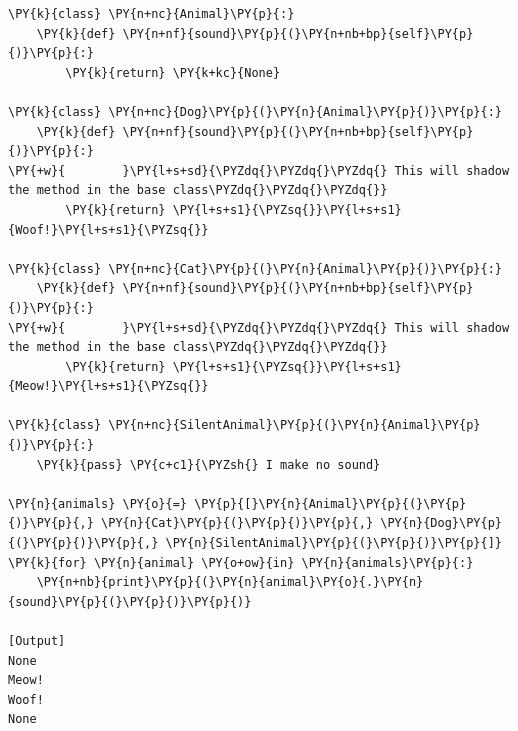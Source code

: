 \begin{Verbatim}[label=\makebox{\url{https://github.com/lucabaldini/cmepda/tree/master/slides/latex/snippets/overload.py}},commandchars=\\\{\}]
\PY{k}{class} \PY{n+nc}{Animal}\PY{p}{:}
    \PY{k}{def} \PY{n+nf}{sound}\PY{p}{(}\PY{n+nb+bp}{self}\PY{p}{)}\PY{p}{:}
        \PY{k}{return} \PY{k+kc}{None}

\PY{k}{class} \PY{n+nc}{Dog}\PY{p}{(}\PY{n}{Animal}\PY{p}{)}\PY{p}{:}
    \PY{k}{def} \PY{n+nf}{sound}\PY{p}{(}\PY{n+nb+bp}{self}\PY{p}{)}\PY{p}{:}
\PY{+w}{        }\PY{l+s+sd}{\PYZdq{}\PYZdq{}\PYZdq{} This will shadow the method in the base class\PYZdq{}\PYZdq{}\PYZdq{}}
        \PY{k}{return} \PY{l+s+s1}{\PYZsq{}}\PY{l+s+s1}{Woof!}\PY{l+s+s1}{\PYZsq{}}
        
\PY{k}{class} \PY{n+nc}{Cat}\PY{p}{(}\PY{n}{Animal}\PY{p}{)}\PY{p}{:}
    \PY{k}{def} \PY{n+nf}{sound}\PY{p}{(}\PY{n+nb+bp}{self}\PY{p}{)}\PY{p}{:}
\PY{+w}{        }\PY{l+s+sd}{\PYZdq{}\PYZdq{}\PYZdq{} This will shadow the method in the base class\PYZdq{}\PYZdq{}\PYZdq{}}
        \PY{k}{return} \PY{l+s+s1}{\PYZsq{}}\PY{l+s+s1}{Meow!}\PY{l+s+s1}{\PYZsq{}}

\PY{k}{class} \PY{n+nc}{SilentAnimal}\PY{p}{(}\PY{n}{Animal}\PY{p}{)}\PY{p}{:}
    \PY{k}{pass} \PY{c+c1}{\PYZsh{} I make no sound}
     
\PY{n}{animals} \PY{o}{=} \PY{p}{[}\PY{n}{Animal}\PY{p}{(}\PY{p}{)}\PY{p}{,} \PY{n}{Cat}\PY{p}{(}\PY{p}{)}\PY{p}{,} \PY{n}{Dog}\PY{p}{(}\PY{p}{)}\PY{p}{,} \PY{n}{SilentAnimal}\PY{p}{(}\PY{p}{)}\PY{p}{]}
\PY{k}{for} \PY{n}{animal} \PY{o+ow}{in} \PY{n}{animals}\PY{p}{:}
    \PY{n+nb}{print}\PY{p}{(}\PY{n}{animal}\PY{o}{.}\PY{n}{sound}\PY{p}{(}\PY{p}{)}\PY{p}{)}

[Output]
None
Meow!
Woof!
None
\end{Verbatim}